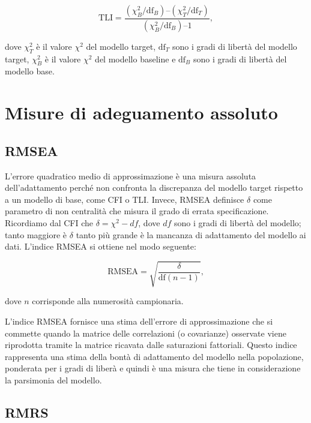 \documentclass[
  11pt,
]{krantz}
\theoremstyle{definition}
\theoremstyle{definition}
\theoremstyle{definition}
\theoremstyle{definition}
\theoremstyle{remark}
\begin{document}
\begin{equation}
\mbox{TLI} = \frac{(\chi^2_B / \mbox{df}_B)–(\chi^2_T / \mbox{df}_T)}{(\chi^2_B / \mbox{df}_B) – 1},
\end{equation}

dove \(\chi^2_T\) è il valore \(\chi^2\) del modello target, \(\mbox{df}_T\) sono i gradi di libertà del modello target, \(\chi^2_B\) è il valore \(\chi^2\) del modello baseline e \(\mbox{df}_B\) sono i gradi di libertà del modello base.

\hypertarget{misure-di-adeguamento-assoluto}{%
\section{Misure di adeguamento assoluto}\label{misure-di-adeguamento-assoluto}}

\hypertarget{rmsea}{%
\subsection{RMSEA}\label{rmsea}}

L'errore quadratico medio di approssimazione è una misura assoluta dell'adattamento perché non confronta la discrepanza del modello target rispetto a un modello di base, come CFI o TLI. Invece, RMSEA definisce \(\delta\) come parametro di non centralità che misura il grado di errata specificazione. Ricordiamo dal CFI che \(\delta = \chi^2 - df\), dove \(df\) sono i gradi di libertà del modello; tanto maggiore è \(\delta\) tanto più grande è la mancanza di adattamento del modello ai dati. L'indice RMSEA si ottiene nel modo seguente:

\begin{equation}
\mbox{RMSEA} = \sqrt{\frac{\delta}{\mbox{df}(n-1)}},
\end{equation}

dove \(n\) corrisponde alla numerosità campionaria.

L'indice RMSEA fornisce una stima dell'errore di approssimazione che si commette quando la matrice delle correlazioni (o covarianze) osservate viene riprodotta tramite la matrice ricavata dalle saturazioni fattoriali. Questo indice rappresenta una stima della bontà di adattamento del modello nella popolazione, ponderata per i gradi di liberà e quindi è una misura che tiene in considerazione la parsimonia del modello.

\hypertarget{rmrs}{%
\subsection{RMRS}\label{rmrs}}
\end{document}
